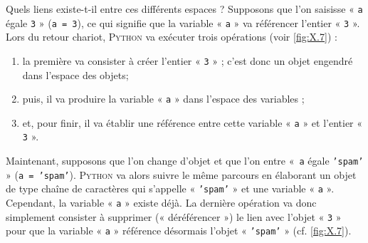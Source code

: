 %
Quels liens existe-t-il entre ces différents espaces ?
Supposons que l'on saisisse « \texttt{a} égale \texttt{3} » (\texttt{a = 3}), ce qui signifie que la variable « \texttt{a} » va référencer l'entier « \texttt{3} ». 
Lors du retour chariot, \textsc{Python} va exécuter trois opérations (voir \cref{fig:X.7}) :
\begin{enumerate}
	\item la première va consister à créer l'entier « \texttt{3} » ; c'est donc un objet engendré dans l'espace des objets;
	\item puis, il va produire la variable « \texttt{a} » dans l'espace des variables ;
	\item et, pour finir, il va établir une référence entre cette variable « \texttt{a} » et l'entier « \texttt{3} ».
\end{enumerate}

Maintenant, supposons que l'on change d'objet et que l'on entre «~\texttt{a} égale \texttt{'spam'} » (\texttt{a = 'spam'}). \textsc{Python} va alors suivre le même parcours en élaborant un objet de type chaîne de caractères qui s'appelle « \texttt{'spam'} » et une variable « \texttt{a} ». Cependant, la variable « \texttt{a} » existe déjà. La dernière opération va donc simplement consister à supprimer (« déréférencer ») le lien avec l'objet « \texttt{3} » pour que la variable « \texttt{a} » référence désormais l'objet « \texttt{'spam'} » (cf. \cref{fig:X.7}).


